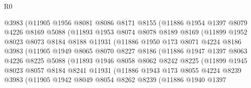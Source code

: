 \begin{lexlean}{R0}
\begin{coremodule}
                @3983
                (@11905
                  @1956
                  @8081
                  @8086
                  @8171
                  @8155
                  (@11886
                    @1954
                    @1397
                    @8079
                    @4226
                    @8169
                    @5088
                    (@11893
                      @1953
                      @8074
                      @8078
                      @8189
                      @8169
                      (@11899
                        @1952
                        @8023
                        @8073
                        @8184
                        @8188
                        @11931
                        (@11886
                          @1950
                          @173
                          @8071
                          @4224
                          @8186
                          @3983
                          (@11905
                            @1949
                            @8065
                            @8070
                            @8227
                            @8186
                            (@11886
                              @1947
                              @1397
                              @8063
                              @4226
                              @8225
                              @5088
                              (@11893
                                @1946
                                @8058
                                @8062
                                @8242
                                @8225
                                (@11899
                                  @1945
                                  @8023
                                  @8057
                                  @8184
                                  @8241
                                  @11931
                                  (@11886
                                    @1943
                                    @173
                                    @8055
                                    @4224
                                    @8239
                                    @3983
                                    (@11905
                                      @1942
                                      @8049
                                      @8054
                                      @8262
                                      @8239
                                      (@11886
                                        @1940
                                        @1397

\end{coremodule}
\end{lexlean}
